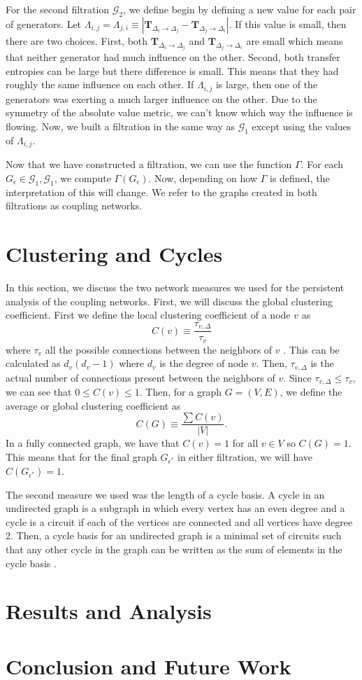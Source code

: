 \documentclass{article}
\theoremstyle{definition}
\newcommand{\Tb}{\mathbf{T}}
\newcommand{\G}{\mathcal{G} }
\begin{document}
For the second filtration $\G_2$, we define begin by defining a new value for each pair of generators. Let $\Lambda_{i,j} = \Lambda_{j,i} \equiv |\Tb_{\Delta_i \to \Delta_j} - \Tb_{\Delta_j \to \Delta_i}|$. If this value is small, then there are two choices. First, both $\Tb_{\Delta_i \to \Delta_j}$ and $\Tb_{\Delta_j \to \Delta_i}$ are small which means that neither generator had much influence on the other. Second, both transfer entropies can be large but there difference is small. This means that they had roughly the same influence on each other. If $\Lambda_{i,j}$ is large, then one of the generators was exerting a much larger influence on the other. Due to the symmetry of the absolute value metric, we can't know which way the influence is flowing. Now, we built a filtration in the same way as $\G_1$ except using the values of $\Lambda_{i,j}$. 

Now that we have constructed a filtration, we can use the function $\Gamma$. For each $G_\epsilon \in \G_1,\G_1$, we compute $\Gamma(G_\epsilon)$. Now, depending on how $\Gamma$ is defined, the interpretation of this will change. We refer to the graphs created in both filtrations as coupling networks. 
\section{Clustering and Cycles}\label{sec:networkmeasures}
In this section, we discuss the two network measures we used for the persistent analysis of the coupling networks. First, we will discuss the global clustering coefficient. First we define the local clustering coefficient of a node $v$ as 
\[C(v) \equiv \frac{\tau_{v,\Delta}}{\tau_v}\]
where $\tau_v$ all the possible connections between the neighbors of $v$ \cite{opsahl2013triadic}. This can be calculated as $d_v(d_v-1)$ where $d_v$ is the degree of node $v$. Then, $\tau_{v,\Delta}$ is the actual number of connections present between the neighbors of $v$. Since $\tau_{v,\Delta} \leq \tau_v$, we can see that $0\leq C(v) \leq 1$. Then, for a graph $G = (V,E)$, we define the average or global clustering coefficient as 
\[C(G) \equiv \frac{\sum C(v)}{|V|}.\]
In a fully connected graph, we have that $C(v) = 1$ for all $v \in V$ so $C(G) = 1$. This means that for the final graph $G_{\epsilon^*}$ in either filtration, we will have $C(G_{\epsilon^*}) = 1$. 

The second measure we used was the length of a cycle basis. A cycle in an undirected graph is a subgraph in which every vertex has an even degree and a cycle is a circuit if each of the vertices are connected and all vertices have degree 2. Then, a cycle basis for an undirected graph is a minimal set of circuits such that any other cycle in the graph can be written as the sum of elements in the cycle basis \cite{kavitha2009cycle}. 
\section{Results and Analysis}
\section{Conclusion and Future Work}

\end{document}
